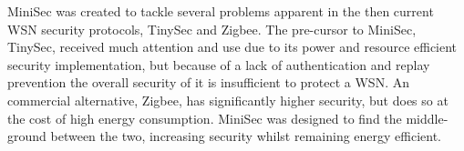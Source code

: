 MiniSec was created to tackle several problems apparent in the then current WSN security protocols, TinySec and Zigbee. The pre-cursor to MiniSec, TinySec, received much attention and use due to its power and resource efficient security implementation, but because of a lack of authentication and replay prevention the overall security of it is insufficient to protect a WSN. An commercial alternative, Zigbee, has significantly higher security, but does so at the cost of high energy consumption. MiniSec was designed to find the middle-ground between the two, increasing security whilst remaining energy efficient. 